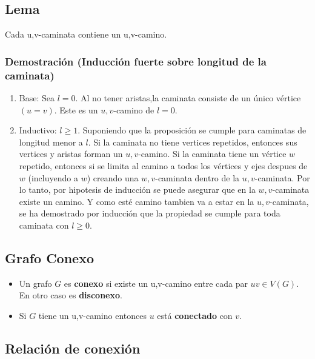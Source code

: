\documentclass[a4paper]{book}
\begin{document}
\subsection{Lema}

Cada u,v-caminata contiene un u,v-camino.

\subsubsection{Demostración (Inducción fuerte sobre longitud de la caminata)}
\label{ssec:demostracion_induccion_fuerte_sobre_longitud_de_la_caminata_}
\begin{enumerate}[{P}]
    \item Base: Sea \(l=0\). Al no tener aristas,la caminata consiste de un
        único vértice \(\left(u=v\right)\). Este es un \(u,v\)-camino de
        \(l=0\).
    \item Inductivo: \(l\ge 1\). Suponiendo que la proposición se cumple para
        caminatas de longitud menor a \(l\). Si la caminata no tiene vertices
        repetidos, entonces sus vertices y aristas forman un \(u,v\)-camino. Si
        la caminata tiene un vértice \(w\) repetido, entonces si se limita al
        camino a todos los vértices y ejes despues de \(w\) (incluyendo a
        \(w\)) creando una \(w,v\)-caminata dentro de la \(u,v\)-caminata. Por
        lo tanto, por hipotesis de inducción se puede asegurar que en la
        \(w,v\)-caminata existe un camino. Y como esté camino tambien va a
        estar en la \(u,v\)-caminata, se ha demostrado por inducción que la
        propiedad se cumple para toda caminata con \(l\ge 0\).
\end{enumerate}


\subsection{Grafo Conexo}
\label{ssec:grafo_conexo}

\begin{itemize}
    \item Un grafo \(G\) es \textbf{conexo} si existe un u,v-camino entre cada
        par \(uv\in V\left( G \right)\). En otro caso es \textbf{disconexo}.
    \item  Si \(G\) tiene un u,v-camino entonces \(u\) está \textbf{conectado}
        con \(v\).
\end{itemize}

\subsection{Relación de conexión}
\label{ssec:relacion_de_conexion}
\end{document}
